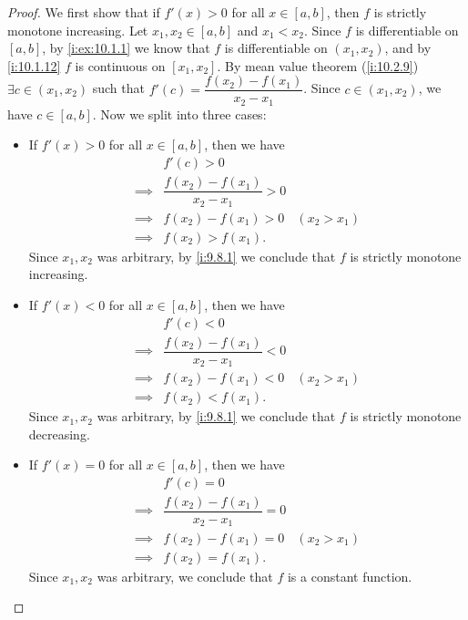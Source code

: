 \begin{proof}
  We first show that if \(f'(x) > 0\) for all \(x \in [a, b]\), then \(f\) is strictly monotone increasing.
  Let \(x_1, x_2 \in [a, b]\) and \(x_1 < x_2\).
  Since \(f\) is differentiable on \([a, b]\), by \cref{i:ex:10.1.1} we know that \(f\) is differentiable on \((x_1, x_2)\), and by \cref{i:10.1.12} \(f\) is continuous on \([x_1, x_2]\).
  By mean value theorem (\cref{i:10.2.9}) \(\exists c \in (x_1, x_2)\) such that \(f'(c) = \dfrac{f(x_2) - f(x_1)}{x_2 - x_1}\).
  Since \(c \in (x_1, x_2)\), we have \(c \in [a, b]\).
  Now we split into three cases:
  \begin{itemize}
    \item If \(f'(x) > 0\) for all \(x \in [a, b]\), then we have
          \begin{align*}
                     & f'(c) > 0                                            \\
            \implies & \dfrac{f(x_2) - f(x_1)}{x_2 - x_1} > 0               \\
            \implies & f(x_2) - f(x_1) > 0                    & (x_2 > x_1) \\
            \implies & f(x_2) > f(x_1).
          \end{align*}
          Since \(x_1, x_2\) was arbitrary, by \cref{i:9.8.1} we conclude that \(f\) is strictly monotone increasing.
    \item If \(f'(x) < 0\) for all \(x \in [a, b]\), then we have
          \begin{align*}
                     & f'(c) < 0                                            \\
            \implies & \dfrac{f(x_2) - f(x_1)}{x_2 - x_1} < 0               \\
            \implies & f(x_2) - f(x_1) < 0                    & (x_2 > x_1) \\
            \implies & f(x_2) < f(x_1).
          \end{align*}
          Since \(x_1, x_2\) was arbitrary, by \cref{i:9.8.1} we conclude that \(f\) is strictly monotone decreasing.
    \item If \(f'(x) = 0\) for all \(x \in [a, b]\), then we have
          \begin{align*}
                     & f'(c) = 0                                            \\
            \implies & \dfrac{f(x_2) - f(x_1)}{x_2 - x_1} = 0               \\
            \implies & f(x_2) - f(x_1) = 0                    & (x_2 > x_1) \\
            \implies & f(x_2) = f(x_1).
          \end{align*}
          Since \(x_1, x_2\) was arbitrary, we conclude that \(f\) is a constant function.
  \end{itemize}
\end{proof}

